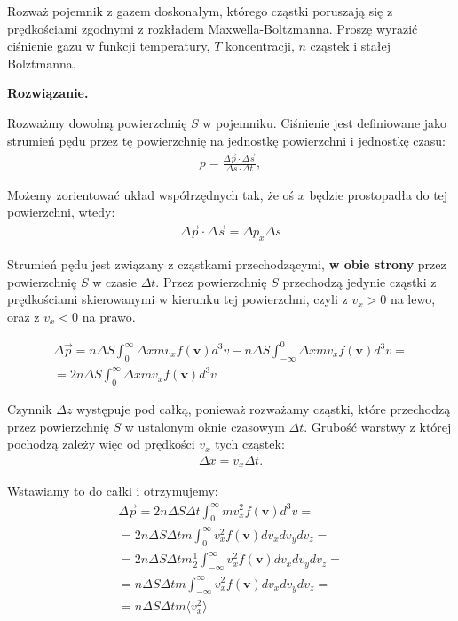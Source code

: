 \documentclass[11pt,a4paper]{article}
\newenvironment{solution}{\vspace{1cm} \par\textbf{Rozwiązanie.} \vspace{1cm}}{}
\begin{document}
Rozważ pojemnik z gazem doskonałym, którego cząstki poruszają się z prędkościami zgodnymi z 
rozkładem Maxwella-Boltzmanna. Proszę wyrazić ciśnienie gazu w funkcji temperatury, $T$
koncentracji, $n$ cząstek i stałej Bolztmanna.

\begin{solution}

Rozważmy dowolną powierzchnię $S$ w pojemniku. Ciśnienie jest definiowane jako 
strumień pędu przez tę powierzchnię na jednostkę powierzchni i jednostkę czasu:
\begin{align*}
  p = \frac{\Delta \vec{p} \cdot \Delta \vec{s}}{\Delta s \cdot \Delta t},
\end{align*}

Możemy zorientować układ współrzędnych tak, że oś $x$ będzie prostopadła do tej powierzchni,
wtedy:
\begin{align*}
    \Delta \vec{p} \cdot \Delta \vec{s} = \Delta p_x \Delta s
\end{align*}

Strumień pędu jest związany z cząstkami przechodzącymi, 
{\bf w obie strony} przez powierzchnię $S$ w czasie $\Delta t$.
Przez powierzchnię $S$ przechodzą jedynie cząstki z prędkościami 
skierowanymi w kierunku tej powierzchni, czyli z $v_x > 0$
na lewo, oraz z $v_x < 0$ na prawo.

\begin{align*}
  \Delta \vec{p} = n\Delta S \int_{0}^\infty \Delta x m v_x f(\mathbf{v}) d^3v
    - n\Delta S\int_{-\infty}^0 \Delta x m v_x f(\mathbf{v}) d^3v = \\
  = 2n\Delta S \int_{0}^\infty \Delta x m v_x f(\mathbf{v}) d^3v 
\end{align*}

Czynnik $\Delta z$ występuje pod całką, ponieważ rozważamy cząstki, które 
przechodzą przez powierzchnię $S$ w ustalonym oknie czasowym $\Delta t$. 
Grubość warstwy z której pochodzą zależy więc od prędkości $v_x$ tych cząstek:
\begin{align*}
  \Delta x = v_x \Delta t.
\end{align*}

Wstawiamy to do całki i otrzymujemy:
\begin{align*}
  \Delta \vec{p} = 2n\Delta S \Delta t \int_{0}^\infty m v_x^2 f(\mathbf{v}) d^3v = \\
  = 2n\Delta S \Delta t m \int_{0}^\infty  v_x^2 f(\mathbf{v}) dv_x dv_y dv_z = \\
  = 2n\Delta S \Delta t m \frac{1}{2} \int_{-\infty}^\infty  v_x^2 f(\mathbf{v}) dv_x dv_y dv_z = \\
  = n\Delta S \Delta t m \int_{-\infty}^\infty  v_x^2 f(\mathbf{v}) dv_x dv_y dv_z = \\
  = n\Delta S \Delta t m \langle v_x^2 \rangle
\end{align*}


\end{solution}
\end{document}
